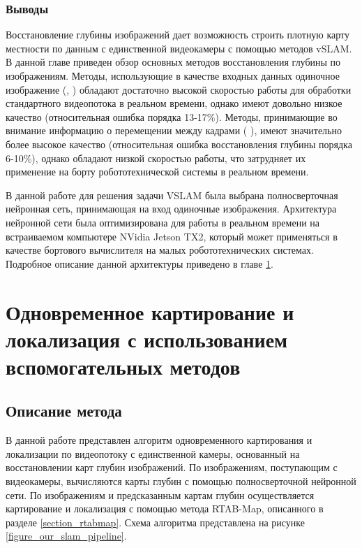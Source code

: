 \documentclass{mipt-thesis-ms}
\begin{document}
	\subsection{Выводы}
	
	Восстановление глубины изображений дает возможность строить плотную карту местности по данным с единственной видеокамеры с помощью методов vSLAM. В данной главе приведен обзор основных методов восстановления глубины по изображениям. Методы, использующие в качестве входных данных одиночное изображение (\cite{laina2016deeper}, \cite{wofk2019fastdepth}) обладают достаточно высокой скоростью работы для обработки стандартного видеопотока в реальном времени, однако имеют довольно низкое качество (относительная ошибка порядка 13-17\%). Методы, принимающие во внимание информацию о перемещении между кадрами (\cite{zhang2019exploiting} \cite{luo2020consistent} \cite{teed2018deepv2d}), имеют значительно более высокое качество (относительная ошибка восстановления глубины порядка 6-10\%), однако обладают низкой скоростью работы, что затрудняет их применение на борту робототехнической системы в реальном времени.
	
	В данной работе для решения задачи VSLAM была выбрана полносверточная нейронная сеть, принимающая на вход одиночные изображения. Архитектура нейронной сети была оптимизирована для работы в реальном времени на встраиваемом компьютере NVidia Jetson TX2, который может применяться в качестве бортового вычислителя на малых робототехнических системах. Подробное описание данной архитектуры приведено в главе \ref{chapter_our_slam}.
	
	
	\chapter{Одновременное картирование и локализация с использованием вспомогательных методов}
	\label{chapter_our_slam}
	
	\section{Описание метода}
	
	В данной работе представлен алгоритм одновременного картирования и локализации по видеопотоку с единственной камеры, основанный на восстановлении карт глубин изображений. По изображениям, поступающим с видеокамеры, вычисляются карты глубин с помощью полносверточной нейронной сети. По изображениям и предсказанным картам глубин осуществляется картирование и локализация с помощью метода RTAB-Map, описанного в разделе \ref{section_rtabmap}. Схема алгоритма представлена на рисунке \ref{figure_our_slam_pipeline}.
	
\end{document}
